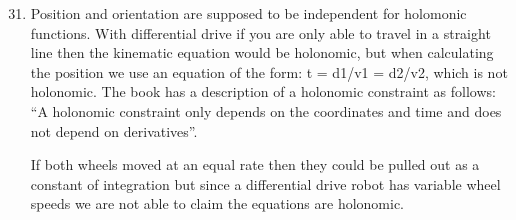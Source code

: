 \documentclass[letterpaper,10pt,english]{sphinxmanual}
\begin{document}
\begin{enumerate}
\begin{sphinxVerbatim}[commandchars=\\\{\}]
          
          
      
                  
          
          
       \PYG{p}{[}\PYG{p}{[}\PYG{p}{]}\PYG{p}{]}

      \PYG{p}{[}\PYG{p}{]}
\end{sphinxVerbatim}

\end{enumerate}
\begin{enumerate}
\setcounter{enumi}{30}
\item {} 

Position and orientation are supposed to be independent for holomonic functions.
With differential drive if you are only able to travel in a straight line then the kinematic equation would be holonomic, but
when calculating the position we use an equation of the form: t = d1/v1 = d2/v2, which is not holonomic. The book has a description of a holonomic constraint as follows:
“A holonomic constraint only depends on the coordinates and time and does not depend on derivatives”.

If both wheels moved at an equal rate then they could be pulled out as a constant of integration but since a differential drive robot has variable wheel speeds we are not able to claim the equations are holonomic.

\end{enumerate}



\renewcommand{\indexname}{Index}
\printindex
\end{document}
